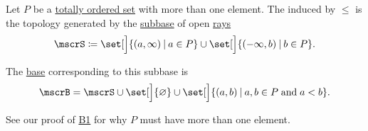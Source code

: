 \begin{definition}\label{def:order_topology}
  Let \( P \) be a \hyperref[def:partially_ordered_set]{totally ordered set} with more than one element. The  induced by \( \leq \) is the topology generated by the \hyperref[def:topological_subbase]{subbase} of open \hyperref[def:order_interval/ray]{rays}
  \begin{equation}\label{eq:def:order_topology/subbase}
    \mscrS \coloneqq \set[\Big]{ (a, \infty) \given a \in P } \cup \set[\Big]{ (-\infty, b) \given b \in P }.
  \end{equation}

  The \hyperref[def:topological_base]{base} corresponding to this subbase is
  \begin{equation}\label{eq:def:order_topology/base}
    \mscrB = \mscrS \cup \set[\Big]{ \varnothing } \cup \set[\Big]{ (a, b) \given a, b \in P \T{and} a < b }.
  \end{equation}

  See our proof of \hyperref[thm:topology_from_base/B1]{B1} for why \( P \) must have more than one element.
\end{definition}
